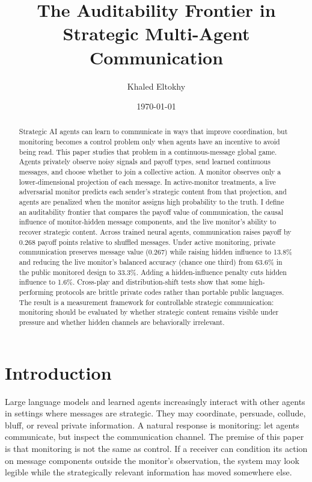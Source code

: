 \documentclass[11pt]{article}
\title{The Auditability Frontier in Strategic Multi-Agent Communication}
\author{Khaled Eltokhy}
\date{\today}
\begin{document}
\maketitle

\begin{abstract}
Strategic AI agents can learn to communicate in ways that improve coordination, but monitoring becomes a control problem only when agents have an incentive to avoid being read. This paper studies that problem in a continuous-message global game. Agents privately observe noisy signals and payoff types, send learned continuous messages, and choose whether to join a collective action. A monitor observes only a lower-dimensional projection of each message. In active-monitor treatments, a live adversarial monitor predicts each sender's strategic content from that projection, and agents are penalized when the monitor assigns high probability to the truth. I define an auditability frontier that compares the payoff value of communication, the causal influence of monitor-hidden message components, and the live monitor's ability to recover strategic content. Across trained neural agents, communication raises payoff by 0.268 payoff points relative to shuffled messages. Under active monitoring, private communication preserves message value (0.267) while raising hidden influence to 13.8\% and reducing the live monitor's balanced accuracy (chance one third) from 63.6\% in the public monitored design to 33.3\%. Adding a hidden-influence penalty cuts hidden influence to 1.6\%. Cross-play and distribution-shift tests show that some high-performing protocols are brittle private codes rather than portable public languages. The result is a measurement framework for controllable strategic communication: monitoring should be evaluated by whether strategic content remains visible under pressure and whether hidden channels are behaviorally irrelevant.
\end{abstract}

\section{Introduction}

Large language models and learned agents increasingly interact with other agents in settings where messages are strategic. They may coordinate, persuade, collude, bluff, or reveal private information. A natural response is monitoring: let agents communicate, but inspect the communication channel. The premise of this paper is that monitoring is not the same as control. If a receiver can condition its action on message components outside the monitor's observation, the system may look legible while the strategically relevant information has moved somewhere else.
\end{document}
